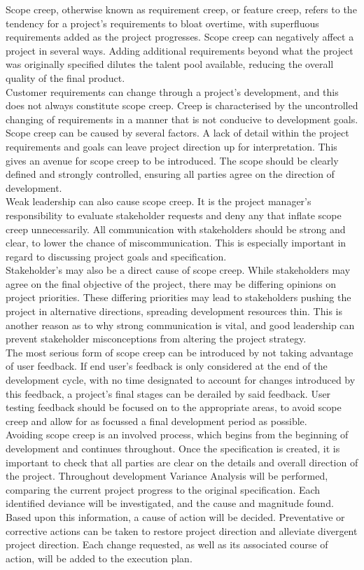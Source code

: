 \documentclass [12pt]{article}
\begin{document}
Scope creep, otherwise known as requirement creep, or feature creep, refers to the tendency for a project’s requirements to bloat overtime, with superfluous requirements added as the project progresses. Scope creep can negatively affect a project in several ways. Adding additional requirements beyond what the project was originally specified dilutes the talent pool available, reducing the overall quality of the final product.
\\
Customer requirements can change through a project’s development, and this does not always constitute scope creep. Creep is characterised by the uncontrolled changing of requirements in a manner that is not conducive to development goals. 
Scope creep can be caused by several factors. A lack of detail within the project requirements and goals can leave project direction up for interpretation. This gives an avenue for scope creep to be introduced. The scope should be clearly defined and strongly controlled, ensuring all parties agree on the direction of development.
\\
Weak leadership can also cause scope creep. It is the project manager’s responsibility to evaluate stakeholder requests and deny any that inflate scope creep unnecessarily. All communication with stakeholders should be strong and clear, to lower the chance of miscommunication. This is especially important in regard to discussing project goals and specification. 
\\
Stakeholder’s may also be a direct cause of scope creep. While stakeholders may agree on the final objective of the project, there may be differing opinions on project priorities. These differing priorities may lead to stakeholders pushing the project in alternative directions, spreading development resources thin. This is another reason as to why strong communication is vital, and good leadership can prevent stakeholder misconceptions from altering the project strategy.
\\
The most serious form of scope creep can be introduced by not taking advantage of user feedback. If end user’s feedback is only considered at the end of the development cycle, with no time designated to account for changes introduced by this feedback, a project’s final stages can be derailed by said feedback. User testing feedback should be focused on to the appropriate areas, to avoid scope creep and allow for as focussed a final development period as possible.
\\
Avoiding scope creep is an involved process, which begins from the beginning of development and continues throughout. Once the specification is created, it is important to check that all parties are clear on the details and overall direction of the project. Throughout development Variance Analysis will be performed, comparing the current project progress to the original specification. Each identified deviance will be investigated, and the cause and magnitude found. Based upon this information, a cause of action will be decided. Preventative or corrective actions can be taken to restore project direction and alleviate divergent project direction. Each change requested, as well as its associated course of action, will be added to the execution plan.
\end{document}
